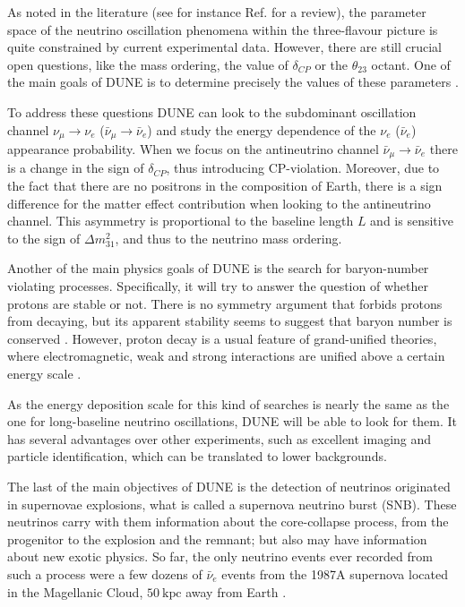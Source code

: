 As noted in the literature (see for instance Ref. \cite{deSalas2020} for a review), the parameter space of the neutrino oscillation phenomena within the three-flavour picture is quite constrained by current experimental data. However, there are still crucial open questions, like the mass ordering, the value of $\delta_{CP}$ or the $\theta_{23}$ octant. One of the main goals of DUNE is to determine precisely the values of these parameters \cite{DUNE2020TDR2}.

To address these questions DUNE can look to the subdominant oscillation channel $\nu_{\mu} \rightarrow \nu_{e}$ ($\bar{\nu}_{\mu} \rightarrow \bar{\nu}_{e}$) and study the energy dependence of the $\nu_{e}$ ($\bar{\nu}_{e}$) appearance probability. When we focus on the antineutrino channel $\bar{\nu}_{\mu} \rightarrow \bar{\nu}_{e}$ there is a change in the sign of $\delta_{CP}$, thus introducing CP-violation. Moreover, due to the fact that there are no positrons in the composition of Earth, there is a sign difference for the matter effect contribution when looking to the antineutrino channel. This asymmetry is proportional to the baseline length $L$ and is sensitive to the sign of $\Delta m^{2}_{31}$, and thus to the neutrino mass ordering.

Another of the main physics goals of DUNE is the search for baryon-number violating processes. Specifically, it will try to answer the question of whether protons are stable or not. There is no symmetry argument that forbids protons from decaying, but its apparent stability seems to suggest that baryon number is conserved \cite{Super-Kamiokande2009}. However, proton decay is a usual feature of grand-unified theories, where electromagnetic, weak and strong interactions are unified above a certain energy scale \cite{Raby2006}.

As the energy deposition scale for this kind of searches is nearly the same as the one for long-baseline neutrino oscillations, DUNE will be able to look for them. It has several advantages over other experiments, such as excellent imaging and particle identification, which can be translated to lower backgrounds.

The last of the main objectives of DUNE is the detection of neutrinos originated in supernovae explosions, what is called a supernova neutrino burst (SNB). These neutrinos carry with them information about the core-collapse process, from the progenitor to the explosion and the remnant; but also may have information about new exotic physics. So far, the only neutrino events ever recorded from such a process were a few dozens of $\bar{\nu}_{e}$ events from the 1987A supernova located in the Magellanic Cloud, $50~\mathrm{kpc}$ away from Earth \cite{Kamiokande-II1987, Bionta1987}.

